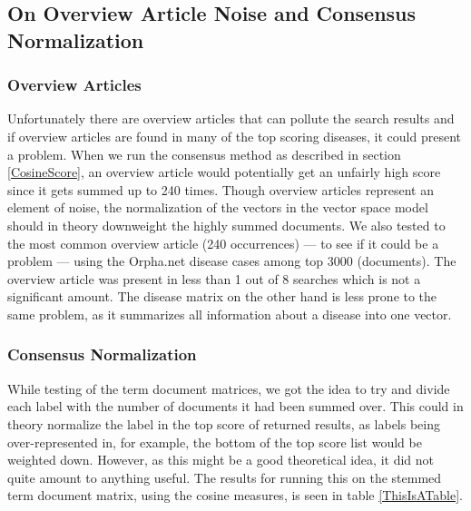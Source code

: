 \subsection{On Overview Article Noise and Consensus Normalization\label{Overview}}

\subsubsection{Overview Articles}
Unfortunately there are overview articles that can pollute the search
results and if overview articles are found in many of the top scoring
diseases, it could present a problem. When we run the consensus method
as described in section \ref{CosineScore}, an overview article would
potentially get an unfairly high score since it gets summed up to 240
times. Though overview articles represent an element of noise, the
normalization of the vectors in the vector space model should in
theory downweight the highly summed documents. We also tested to the
most common overview article (240 occurrences) --- to see if it could
be a problem --- using the Orpha.net disease cases among top 3000
(documents). The overview article was present in less than 1 out of 8
searches which is not a significant amount. The disease matrix on the
other hand is less prone to the same problem, as it summarizes all
information about a disease into one vector.

\subsubsection{Consensus Normalization}
While testing of the term document matrices, we got the idea to try
and divide each label with the number of documents it had been summed
over. This could in theory normalize the label in the top score of
returned results, as labels being over-represented in, for example, the
bottom of the top score list would be weighted down.  However, as this
might be a good theoretical idea, it did not quite amount to anything
useful. The results for running this on the stemmed term document
matrix, using the cosine measures, is seen in table
\ref{ThisIsATable}.

